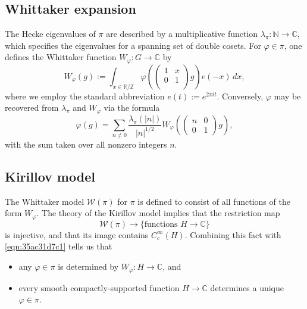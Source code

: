 \documentclass[reqno]{amsart} 
\numberwithin{equation}{section}
\numberwithin{theorem}{section}
\begin{document}
\subsection{Whittaker expansion}\label{sec:35ac3e587a}
The Hecke eigenvalues of $\pi$ are described by a multiplicative function $\lambda_\pi : \mathbb{N} \rightarrow \mathbb{C}$, which specifies the eigenvalues for a spanning set of double cosets.  For $\varphi \in \pi$, one defines the Whittaker function $W_\varphi : G \rightarrow \mathbb{C}$ by
\begin{equation*}
  W_\varphi (g) :=
  \int_{x \in \mathbb{R} / \mathbb{Z} } \varphi \left(
    \begin{pmatrix}
1 & x \\
0 & 1 \\
\end{pmatrix} g \right) e(-x) \, d x,
\end{equation*}
where we employ the standard abbreviation $e(t) := e^{2 \pi i t}$.  Conversely, $\varphi$ may be recovered from $\lambda_\pi$ and $W_\varphi$ via the formula
\begin{equation}\label{eqn:35ac31d7c1}
  \varphi(g) = \sum _{n \neq 0}
  \frac{\lambda_{\pi}(|n|)}{|n|^{1/2}}
  W_\varphi \left( \begin{pmatrix}
      n & 0 \\
      0 & 1
    \end{pmatrix} g \right),
\end{equation}
with the sum taken over all nonzero integers $n$.

\subsection{Kirillov model}\label{sec:35ac31dd2c}
The Whittaker model $\mathcal{W}(\pi)$ for $\pi$ is defined to consist of all functions of the form $W_\varphi$.  The theory of the Kirillov model implies that the restriction map
\begin{equation*}
\mathcal{W}(\pi) \rightarrow \{\text{functions } H \rightarrow \mathbb{C} \}
\end{equation*}
is injective, and that its image contains $C_c^\infty(H)$.  Combining this fact with \eqref{eqn:35ac31d7c1} tells us that
\begin{itemize}
\item any $\varphi \in \pi$ is determined by $W_\varphi : H \rightarrow \mathbb{C}$, and
\item every smooth compactly-supported function $H \rightarrow \mathbb{C}$ determines a unique $\varphi \in \pi$.
\end{itemize}
\end{document}
